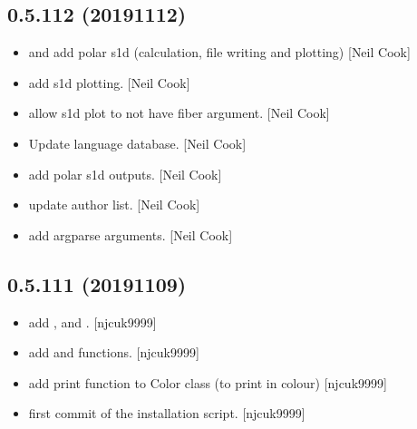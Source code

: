 \documentclass[a4paper,10pt,english]{report}
\begin{document}
\subsection{0.5.112 (2019\sphinxhyphen{}11\sphinxhyphen{}12)}
\label{\detokenize{misc/changelog:id49}}\begin{itemize}
\item {} 
 and  \sphinxhyphen{} add
polar s1d (calculation, file writing and plotting) {[}Neil Cook{]}

\item {} 
 \sphinxhyphen{} add s1d plotting. {[}Neil Cook{]}

\item {} 
 \sphinxhyphen{} allow s1d plot to not have fiber
argument. {[}Neil Cook{]}

\item {} 
Update language database. {[}Neil Cook{]}

\item {} 
  \sphinxhyphen{}
add polar s1d outputs. {[}Neil Cook{]}

\item {} 
 \sphinxhyphen{} update author list. {[}Neil
Cook{]}

\item {} 
 \sphinxhyphen{} add argparse arguments. {[}Neil Cook{]}

\end{itemize}


\subsection{0.5.111 (2019\sphinxhyphen{}11\sphinxhyphen{}09)}
\label{\detokenize{misc/changelog:id50}}\begin{itemize}
\item {} 
 \sphinxhyphen{} add ,
 and . {[}njcuk9999{]}

\item {} 
 \sphinxhyphen{} add  and
 functions. {[}njcuk9999{]}

\item {} 
 \sphinxhyphen{} add print function to Color
class (to print in colour) {[}njcuk9999{]}

\item {} 
 \sphinxhyphen{} first commit of the
installation script. {[}njcuk9999{]}

\end{itemize}
\end{document}

